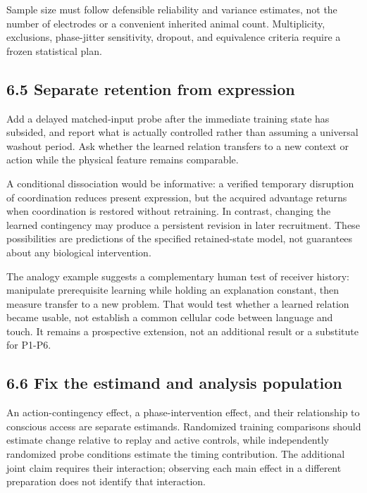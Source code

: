 \documentclass[
  american,
  11pt,
  letterpaper,
]{article}
\begin{document}
Sample size must follow defensible reliability and variance estimates, not the number of electrodes or a convenient inherited animal count. Multiplicity, exclusions, phase-jitter sensitivity, dropout, and equivalence criteria require a frozen statistical plan.

\subsection{6.5 Separate retention from expression}\label{separate-retention-from-expression}

Add a delayed matched-input probe after the immediate training state has subsided, and report what is actually controlled rather than assuming a universal washout period. Ask whether the learned relation transfers to a new context or action while the physical feature remains comparable.

A conditional dissociation would be informative: a verified temporary disruption of coordination reduces present expression, but the acquired advantage returns when coordination is restored without retraining. In contrast, changing the learned contingency may produce a persistent revision in later recruitment. These possibilities are predictions of the specified retained-state model, not guarantees about any biological intervention.

The analogy example suggests a complementary human test of receiver history: manipulate prerequisite learning while holding an explanation constant, then measure transfer to a new problem. That would test whether a learned relation became usable, not establish a common cellular code between language and touch. It remains a prospective extension, not an additional result or a substitute for P1-P6.

\subsection{6.6 Fix the estimand and analysis population}\label{fix-the-estimand-and-analysis-population}

An action-contingency effect, a phase-intervention effect, and their relationship to conscious access are separate estimands. Randomized training comparisons should estimate change relative to replay and active controls, while independently randomized probe conditions estimate the timing contribution. The additional joint claim requires their interaction; observing each main effect in a different preparation does not identify that interaction.
\end{document}
